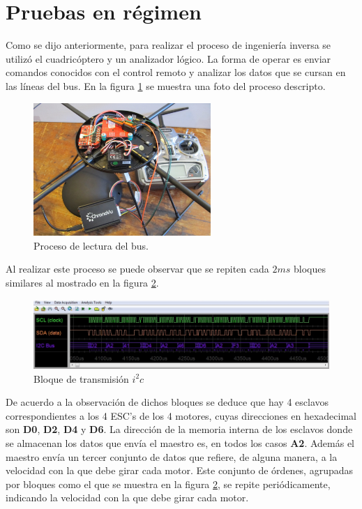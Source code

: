 \documentclass[main]{subfiles}
\begin{document}
\newpage
\section{Pruebas en r\'egimen}

Como se dijo anteriormente, para realizar el proceso de ingenier\'ia inversa se utiliz\'o el cuadric\'optero y un analizador l\'ogico. La forma de operar es enviar comandos conocidos con el control remoto y analizar los datos que se cursan en las l\'ineas del bus. En la figura \ref{fig:sniffing} se muestra una foto del proceso descripto.

\begin{figure}[h!]
	\centering
	\includegraphics[width=0.6\textwidth]{./pics_sniffer/sniffing.jpg}
	\caption{Proceso de lectura del bus.}
	\label{fig:sniffing}
\end{figure}

Al realizar este proceso se puede observar que se repiten cada $2ms$ bloques similares al mostrado en la figura \ref{fig:bloque_snif}.

\begin{figure}[h!]
	\centering
	\includegraphics[width=1\textwidth]{./pics_sniffer/bloque_snif.jpg}
	\caption{Bloque de transmisi\'on $i^2c$}
	\label{fig:bloque_snif}
\end{figure}

De acuerdo a la observaci\'on de dichos bloques se deduce que hay 4 esclavos correspondientes a los 4 ESC's de los 4 motores, cuyas direcciones en hexadecimal son \textbf{D0}, \textbf{D2}, \textbf{D4} y \textbf{D6}. La direcci\'on de la memoria interna de los esclavos donde se almacenan los datos que env\'ia el maestro es, en todos los casos \textbf{A2}. Adem\'as el maestro env\'ia un tercer conjunto de datos que refiere, de alguna manera, a la velocidad con la que debe girar cada motor.
Este conjunto de \'ordenes, agrupadas por bloques como el que se muestra en la figura \ref{fig:bloque_snif}, se repite peri\'odicamente, indicando la velocidad con la que debe girar cada motor.\\
\end{document}
